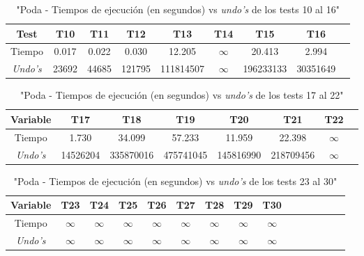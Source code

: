 \documentclass[12pt]{article}
\begin{document}
\begin{center}
\begin{table}[h]
\begin{tabular} {| c | c | c | c | c | c | c | c | c | c |}
            \hline
        \end{tabular}
    \end{table}
    \begin{table}[h]
        \caption{"Poda - Tiempos de ejecución (en segundos) vs \textit{undo's} de los tests 10 al 16"}
        \centering
        \begin{tabular} {| c | c | c | c | c | c | c | c | c |}
            \hline
            Test & T10 & T11 & T12 & T13 & T14 & T15 & T16 \\
            \hline
            Tiempo & 0.017 & 0.022 & 0.030 & 12.205 & $\infty$ & 20.413 & 2.994 \\
            \textit{Undo's} & 23692 & 44685 & 121795 & 111814507 & $\infty$ & 196233133 & 30351649 \\
            \hline
        \end{tabular}
    \end{table}
    \begin{table}[h]
        \caption{"Poda - Tiempos de ejecución (en segundos) vs \textit{undo's} de los tests 17 al 22"}
        \centering
        \begin{tabular} {| c | c | c | c | c | c | c | c |}
            \hline
            Variable & T17 & T18 & T19 & T20 & T21 & T22 \\
            \hline
            Tiempo & 1.730 & 34.099 & 57.233 & 11.959 & 22.398 & $\infty$ \\
            \textit{Undo's} & 14526204 & 335870016 & 475741045 & 145816990 & 218709456 & $\infty$ \\
            \hline
        \end{tabular}
    \end{table}
    \begin{table}[h]
        \caption{"Poda - Tiempos de ejecución (en segundos) vs \textit{undo's} de los tests 23 al 30"}
        \centering
        \begin{tabular} {| c | c | c | c | c | c | c | c | c | c | c | c | c | c | c |}
            \hline
            Variable & T23 & T24 & T25 & T26 & T27 & T28 & T29 & T30 \\
            \hline
            Tiempo & $\infty$ & $\infty$ & $\infty$ & $\infty$ & $\infty$ & $\infty$ & $\infty$ & $\infty$ \\
            \textit{Undo's} & $\infty$ & $\infty$ & $\infty$ & $\infty$ & $\infty$ & $\infty$ & $\infty$ & $\infty$ \\
            \hline
        \end{tabular}

\end{table}
\end{center}
\end{document}
